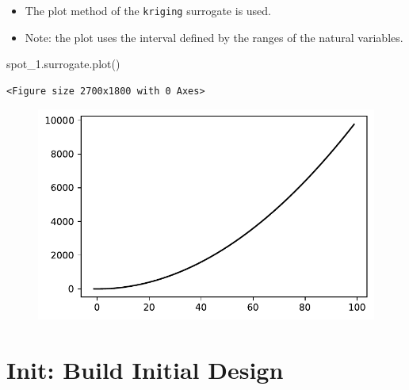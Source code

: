 \documentclass[
  letterpaper,
  DIV=11,
  numbers=noendperiod]{scrreprt}
\newenvironment{Shaded}{\begin{snugshade}}{\end{snugshade}}
\newcommand{\NormalTok}[1]{\textcolor[rgb]{0.00,0.23,0.31}{#1}}
\providecommand{\tightlist}{%
  \setlength{\itemsep}{0pt}\setlength{\parskip}{0pt}}\usepackage{longtable,booktabs,array}
\begin{document}
\begin{itemize}
\tightlist
\item
  The plot method of the \texttt{kriging} surrogate is used.
\item
  Note: the plot uses the interval defined by the ranges of the natural
  variables.
\end{itemize}

\begin{Shaded}
\begin{Highlighting}[]
\NormalTok{spot\_1.surrogate.plot()}
\end{Highlighting}
\end{Shaded}

\begin{verbatim}
<Figure size 2700x1800 with 0 Axes>
\end{verbatim}

\begin{figure}[H]

{\centering \includegraphics{99_spot_doc_files/figure-pdf/cell-9-output-2.pdf}

}

\end{figure}

\hypertarget{init-build-initial-design-1}{%
\section{Init: Build Initial Design}\label{init-build-initial-design-1}}
\end{document}

